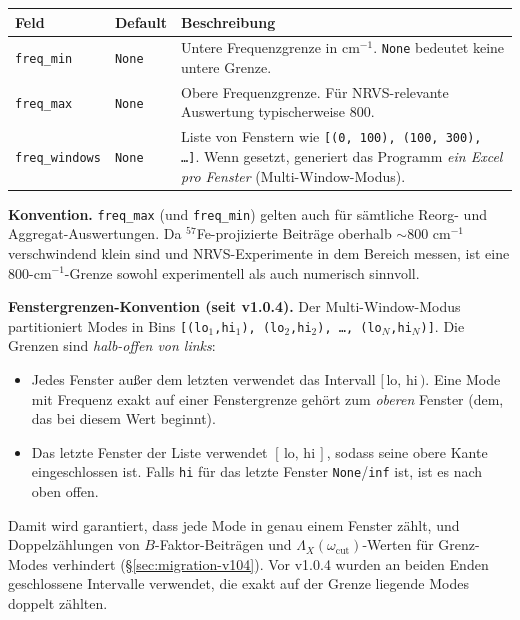 \documentclass[11pt,a4paper,twoside]{article}
\theoremstyle{remark}
\begin{document}
\begin{longtable}{p{} p{} p{}}
\toprule
\textbf{Feld} & \textbf{Default} & \textbf{Beschreibung} \\
\midrule
\endhead
\texttt{freq\_min}      & \texttt{None} & Untere Frequenzgrenze in
  cm$^{-1}$. \texttt{None} bedeutet keine untere Grenze. \\
\texttt{freq\_max}      & \texttt{None} & Obere Frequenzgrenze.
  F\"ur NRVS-relevante Auswertung typischerweise 800. \\
\texttt{freq\_windows}  & \texttt{None} & Liste von Fenstern wie
  \texttt{[(0, 100), (100, 300), \ldots]}. Wenn gesetzt, generiert das
  Programm \emph{ein Excel pro Fenster} (Multi-Window-Modus). \\
\bottomrule
\end{longtable}

\begin{infobox}
\textbf{Konvention.} \texttt{freq\_max} (und \texttt{freq\_min}) gelten
auch f\"ur s\"amtliche Reorg- und Aggregat-Auswertungen. Da
$^{57}$Fe-projizierte Beitr\"age oberhalb $\sim$800 cm$^{-1}$
verschwindend klein sind und NRVS-Experimente in dem Bereich messen,
ist eine 800-cm$^{-1}$-Grenze sowohl experimentell als auch numerisch
sinnvoll.
\end{infobox}

\begin{infobox}
\textbf{Fenstergrenzen-Konvention (seit v1.0.4).}
Der Multi-Window-Modus partitioniert Modes in Bins
\texttt{[(lo$_1$,hi$_1$), (lo$_2$,hi$_2$), \ldots, (lo$_N$,hi$_N$)]}.
Die Grenzen sind \emph{halb-offen von links}:
\begin{itemize}\setlength{\itemsep}{0pt}
  \item Jedes Fenster au\ss er dem letzten verwendet das Intervall
        $[\,\text{lo},\, \text{hi}\,)$. Eine Mode mit Frequenz exakt
        auf einer Fenstergrenze geh\"ort zum \emph{oberen} Fenster
        (dem, das bei diesem Wert beginnt).
  \item Das letzte Fenster der Liste verwendet
        $[\,\text{lo},\, \text{hi}\,]$, sodass seine obere Kante
        eingeschlossen ist. Falls \texttt{hi} f\"ur das letzte
        Fenster \texttt{None}/\texttt{inf} ist, ist es nach oben
        offen.
\end{itemize}
Damit wird garantiert, dass jede Mode in genau einem Fenster z\"ahlt,
und Doppelz\"ahlungen von $B$-Faktor-Beitr\"agen und
$\Lambda_X(\omega_\text{cut})$-Werten f\"ur Grenz-Modes
verhindert (\S\ref{sec:migration-v104}). Vor v1.0.4 wurden an beiden
Enden geschlossene Intervalle verwendet, die exakt auf der Grenze
liegende Modes doppelt z\"ahlten.
\end{infobox}
\end{document}
